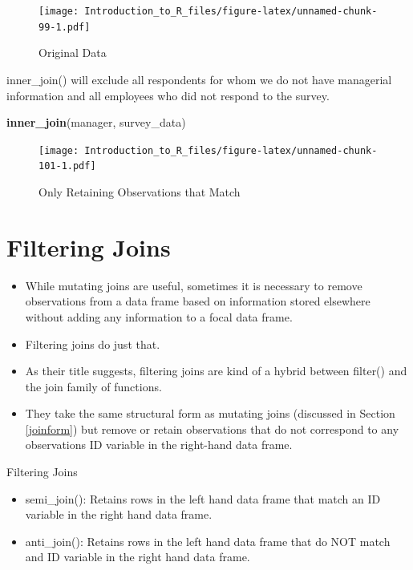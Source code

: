 \documentclass[]{book}
\newenvironment{Shaded}{\begin{snugshade}}{\end{snugshade}}
\newcommand{\KeywordTok}[1]{\textcolor[rgb]{0.13,0.29,0.53}{\textbf{#1}}}
\newcommand{\NormalTok}[1]{#1}
\providecommand{\tightlist}{%
  \setlength{\itemsep}{0pt}\setlength{\parskip}{0pt}}
\theoremstyle{definition}
\theoremstyle{definition}
\theoremstyle{definition}
\theoremstyle{remark}
\let\BeginKnitrBlock\begin \let\EndKnitrBlock\end
\begin{document}
\begin{figure}
\centering
\texttt{[image: Introduction\_to\_R\_files/figure-latex/unnamed-chunk-99-1.pdf]}
\caption{\label{fig:unnamed-chunk-99}Original Data}
\end{figure}

\BeginKnitrBlock{example}
\protect\hypertarget{exm:innerjoin1}{}{\label{exm:innerjoin1} }inner\_join() will exclude all respondents for whom we do not have managerial information and all employees who did not respond to the survey.
\EndKnitrBlock{example}

\begin{Shaded}
\begin{Highlighting}[]
\KeywordTok{inner_join}\NormalTok{(manager, survey_data)}
\end{Highlighting}
\end{Shaded}

\begin{figure}
\centering
\texttt{[image: Introduction\_to\_R\_files/figure-latex/unnamed-chunk-101-1.pdf]}
\caption{\label{fig:unnamed-chunk-101}Only Retaining Observations that Match}
\end{figure}

\hypertarget{filtering-joins}{%
\chapter{Filtering Joins}\label{filtering-joins}}

\begin{itemize}
\tightlist
\item
  While mutating joins are useful, sometimes it is necessary to remove observations from a data frame based on information stored elsewhere without adding any information to a focal data frame.
\item
  Filtering joins do just that.
\item
  As their title suggests, filtering joins are kind of a hybrid between filter() and the join family of functions.
\item
  They take the same structural form as mutating joins (discussed in Section \ref{joinform}) but remove or retain observations that do not correspond to any observations ID variable in the right-hand data frame.
\end{itemize}

Filtering Joins

\begin{itemize}
\tightlist
\item
  semi\_join(): Retains rows in the left hand data frame that match an ID variable in the right hand data frame.
\item
  anti\_join(): Retains rows in the left hand data frame that do NOT match and ID variable in the right hand data frame.
\end{itemize}
\end{document}
